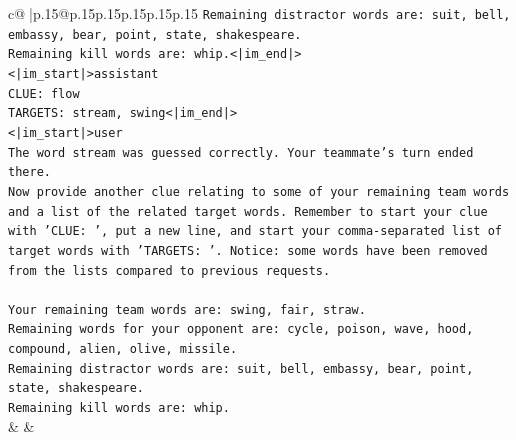 \documentclass{article}
\begin{document}
{\begin{supertabular}{c@{$\;$}|p{.15\linewidth}@{}p{.15\linewidth}p{.15\linewidth}p{.15\linewidth}p{.15\linewidth}p{.15\linewidth}}
{{{\texttt{Remaining distractor words are: suit, bell, embassy, bear, point, state, shakespeare.} \\
\texttt{Remaining kill words are: whip.<|im\_end|>} \\
\texttt{<|im\_start|>assistant} \\
\texttt{CLUE: flow} \\
\texttt{TARGETS: stream, swing<|im\_end|>} \\
\texttt{<|im\_start|>user} \\
\texttt{The word stream was guessed correctly. Your teammate's turn ended there.} \\
\texttt{Now provide another clue relating to some of your remaining team words and a list of the related target words. Remember to start your clue with 'CLUE: ', put a new line, and start your comma{-}separated list of target words with 'TARGETS: '. Notice: some words have been removed from the lists compared to previous requests.} \\
\\ 
\texttt{Your remaining team words are: swing, fair, straw.} \\
\texttt{Remaining words for your opponent are: cycle, poison, wave, hood, compound, alien, olive, missile.} \\
\texttt{Remaining distractor words are: suit, bell, embassy, bear, point, state, shakespeare.} \\
\texttt{Remaining kill words are: whip.} \\
            }
        }
    }
    & & \\ \\


\end{supertabular}}
\end{document}

